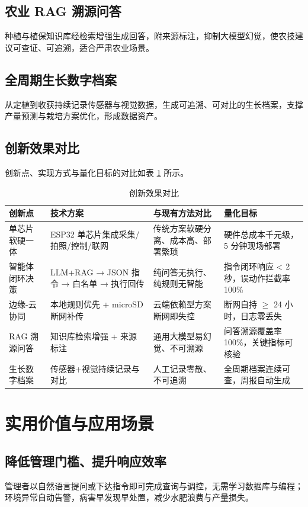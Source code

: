 ﻿\documentclass[11pt]{ctexart}
\begin{document}
\subsection{农业 RAG 溯源问答}
种植与植保知识库经检索增强生成回答，附来源标注，抑制大模型幻觉，使农技建议可查证、可追溯，适合严肃农业场景。

\subsection{全周期生长数字档案}
从定植到收获持续记录传感器与视觉数据，生成可追溯、可对比的生长档案，支撑产量预测与栽培方案优化，形成数据资产。

\subsection{创新效果对比}
创新点、实现方式与量化目标的对比如表 \ref{tab:innovation} 所示。
\begin{longtable}{p{2.3cm}p{4.4cm}p{4.2cm}p{3.6cm}}
  \caption{创新效果对比}\label{tab:innovation}\\
  \toprule
  创新点 & 技术方案 & 与现有方法对比 & 量化目标 \\
  \midrule
  单芯片软硬一体 & ESP32 单芯片集成采集/拍照/控制/联网 & 传统方案软硬分离、成本高、部署繁琐 & 硬件总成本千元级，5 分钟现场部署 \\
  智能体闭环决策 & LLM+RAG → JSON 指令 → 白名单 → 执行回传 & 纯问答无执行、纯规则无智能 & 指令闭环响应 < 2 秒，误动作拦截率 100\% \\
  边缘-云协同 & 本地规则优先 + microSD 断网补传 & 云端依赖型方案断网即失控 & 断网自持 $\geq$ 24 小时，日志零丢失 \\
  RAG 溯源问答 & 知识库检索增强 + 来源标注 & 通用大模型易幻觉、不可溯源 & 问答溯源覆盖率 100\%，关键指标可核验 \\
  生长数字档案 & 传感器+视觉持续记录与对比 & 人工记录零散、不可追溯 & 全周期档案连续可查，周报自动生成 \\
  \bottomrule
\end{longtable}

\section{实用价值与应用场景}
\subsection{降低管理门槛、提升响应效率}
管理者以自然语言提问或下达指令即可完成查询与调控，无需学习数据库与编程；环境异常自动告警，病害早发现早处置，减少水肥浪费与产量损失。
\end{document}
